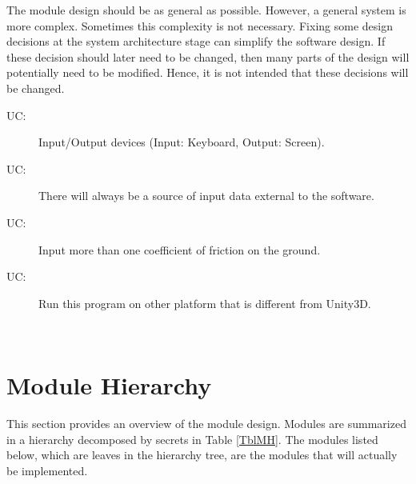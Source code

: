 \documentclass[12pt, titlepage]{article}
\newcounter{ucnum}
\newcommand{\uctheucnum}{UC\theucnum}
\begin{document}
	The module design should be as general as possible. However, a general system is
	more complex. Sometimes this complexity is not necessary. Fixing some design
	decisions at the system architecture stage can simplify the software design. If
	these decision should later need to be changed, then many parts of the design
	will potentially need to be modified. Hence, it is not intended that these
	decisions will be changed.
	
	\begin{description}
		\item[ \uctheucnum \label{ucIO}:] Input/Output devices
		(Input: Keyboard, Output: Screen).
		\item[ \uctheucnum \label{ucInput}:] There will always be
		a source of input data external to the software.
		\item[ \uctheucnum \label{ucFri}:] Input more than one coefficient of friction on the ground.
		\item[ \uctheucnum \label{ucU}:] Run this program on other platform that is different from Unity3D.
	\end{description}
	
	\\
	\section{Module Hierarchy} \label{SecMH}
	
	This section provides an overview of the module design. Modules are summarized
	in a hierarchy decomposed by secrets in Table \ref{TblMH}. The modules listed
	below, which are leaves in the hierarchy tree, are the modules that will
	actually be implemented.
	
\end{document}
